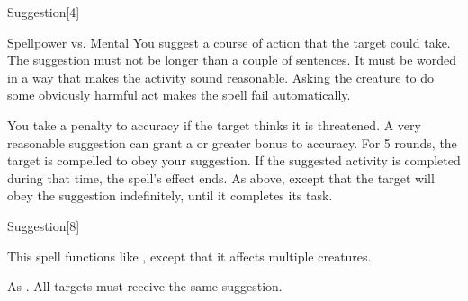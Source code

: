 \begin{spellsection}{Suggestion}[4]
    \begin{spellheader}
    \end{spellheader}
    \begin{spellcontent}
        \begin{spelltargetinginfo}
        \end{spelltargetinginfo}
        \begin{spelleffects}
            \begin{spellattack}{Spellpower vs. Mental}
                \spellspecial You suggest a course of action that the target could take. The suggestion must not be longer than a couple of sentences. It must be worded in a way that makes the activity sound reasonable. Asking the creature to do some obviously harmful act makes the spell fail automatically.

                You take a  penalty to accuracy if the target thinks it is threatened. A very reasonable suggestion can grant a  or greater bonus to accuracy.
                \spellsuccess For 5 rounds, the target is compelled to obey your suggestion. If the suggested activity is completed during that time, the spell's effect ends.
                \spellcritical As above, except that the target will obey the suggestion indefinitely, until it completes its task.
            \end{spellattack}
        \end{spelleffects}
    \end{spellcontent}
    \begin{spellfooter}
        \norepeatspellnotes
        \miscastrandom
    \end{spellfooter}
\end{spellsection}

\begin{spellsection}[Mass]{Suggestion}[8]
    \begin{spellheader}
    \end{spellheader}
    \begin{spellcontent}
        \begin{spelltargetinginfo}
        \end{spelltargetinginfo}
        \begin{spelleffects}
            \spellspecial This spell functions like , except that it affects multiple creatures.
        \end{spelleffects}
    \end{spellcontent}
    \begin{spellfooter}
        \spellnotes As . All targets must receive the same suggestion.
        \miscastexplode
    \end{spellfooter}
\end{spellsection}

